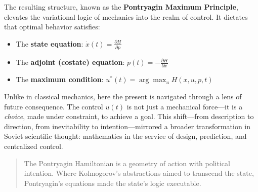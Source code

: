 The resulting structure, known as the \textbf{Pontryagin Maximum Principle}, elevates the variational logic of mechanics into the realm of control. It dictates that optimal behavior satisfies:

\begin{itemize}
  \item The \textbf{state equation}: \( \dot{x}(t) = \frac{\partial H}{\partial p} \)
  \item The \textbf{adjoint (costate) equation}: \( \dot{p}(t) = -\frac{\partial H}{\partial x} \)
  \item The \textbf{maximum condition}: \( u^*(t) = \arg\max_u H(x, u, p, t) \)
\end{itemize}

Unlike in classical mechanics, here the present is navigated through a lens of future consequence. The control \( u(t) \) is not just a mechanical force—it is a \emph{choice}, made under constraint, to achieve a goal. This shift—from description to direction, from inevitability to intention—mirrored a broader transformation in Soviet scientific thought: mathematics in the service of design, prediction, and centralized control.

\begin{quote}
The Pontryagin Hamiltonian is a geometry of action with political intention. Where Kolmogorov’s abstractions aimed to transcend the state, Pontryagin’s equations made the state's logic executable.
\end{quote}

